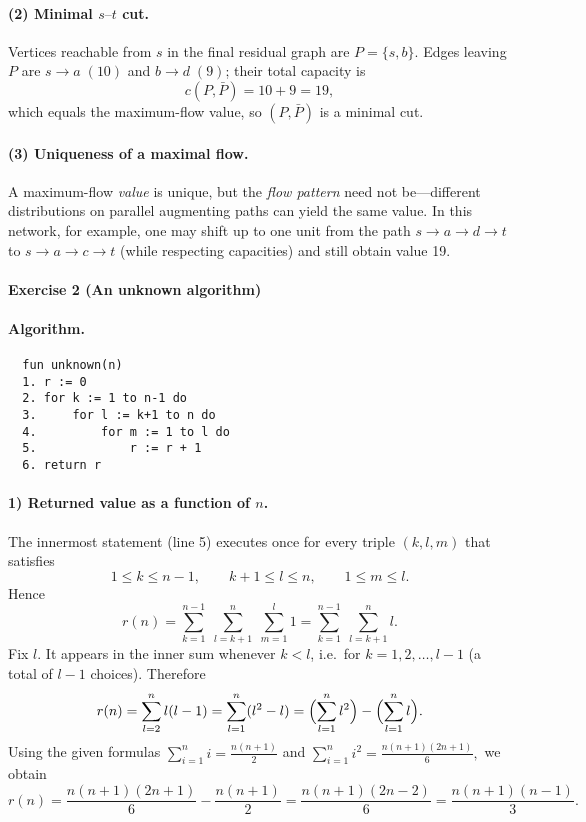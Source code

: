 \documentclass{article}
\theoremstyle{theorem}
\theoremstyle{definition}
\theoremstyle{remark}
\begin{document}
\paragraph{(2) Minimal \(s\text{–}t\) cut.}
Vertices reachable from \(s\) in the final residual graph are
\(P=\{s,b\}\).
Edges leaving \(P\) are \(s\to a\;(10)\) and \(b\to d\;(9)\);
their total capacity is
\[
c(P,\bar P)=10+9=19,
\]
which equals the maximum-flow value, so \((P,\bar P)\) is a minimal cut.

\paragraph{(3) Uniqueness of a maximal flow.}
A maximum-flow \emph{value} is unique, but the \emph{flow pattern} need not
be—different distributions on parallel augmenting paths can yield the same
value.  In this network, for example, one may shift up to one unit from the
path \(s\to a\to d\to t\) to \(s\to a\to c\to t\) (while respecting
capacities) and still obtain value 19.

\newpage

\paragraph*{Exercise 2 (An unknown algorithm)}

\paragraph{Algorithm.}
\begin{lstlisting}
  fun unknown(n)
  1. r := 0
  2. for k := 1 to n-1 do
  3.     for l := k+1 to n do
  4.         for m := 1 to l do
  5.             r := r + 1
  6. return r
\end{lstlisting}  

\paragraph{1) Returned value as a function of \(n\).}
The innermost statement (line 5) executes once for every triple
\((k,l,m)\) that satisfies
\[
1\le k\le n-1,\qquad k+1\le l\le n,\qquad 1\le m\le l .
\]
Hence
\[
r(n)=\sum_{k=1}^{n-1}\;\sum_{l=k+1}^{n}\;\sum_{m=1}^{l}1
      =\sum_{k=1}^{n-1}\;\sum_{l=k+1}^{n} l .
\]
Fix \(l\).  It appears in the inner sum whenever \(k<l\), i.e.\ for
\(k=1,2,\dots,l-1\) (a total of \(l-1\) choices).  Therefore
\[
r(n)=\sum_{l=2}^{n} l(l-1)
     =\sum_{l=1}^{n} (l^{2}-l)
     =\Bigl(\sum_{l=1}^{n} l^{2}\Bigr)-\Bigl(\sum_{l=1}^{n} l\Bigr).
\]
Using the given formulas
\(
\sum_{i=1}^{n} i = \tfrac{n(n+1)}{2}
\)
and
\(
\sum_{i=1}^{n} i^{2}= \tfrac{n(n+1)(2n+1)}{6},
\)
we obtain
\[
r(n)=\frac{n(n+1)(2n+1)}{6}-\frac{n(n+1)}{2}
     =\frac{n(n+1)(2n-2)}{6}
     =\boxed{\dfrac{n(n+1)(n-1)}{3}}.
\]
\end{document}
